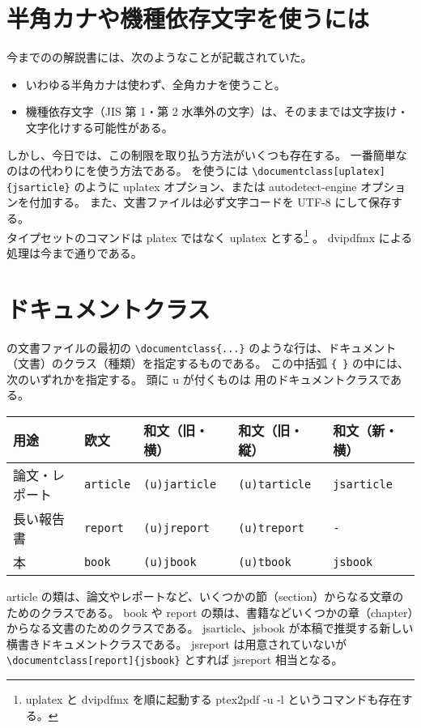 \section{半角カナや機種依存文字を使うには}
今までの\pLaTeX{}の解説書には、次のようなことが記載されていた。
\begin{itemize}\setlength{\leftskip}{-1.00zw}%
\item いわゆる半角カナは使わず、全角カナを使うこと。
\item 機種依存文字（JIS 第 1・第 2 水準外の文字）は、そのままでは文字抜け・文字化けする可能性がある。
\end{itemize}
しかし、今日では、この制限を取り払う方法がいくつも存在する。
一番簡単なのは\pLaTeX{}の代わりに\upLaTeX{}を使う方法である。
\upLaTeX{}を使うには \verb'\documentclass[uplatex]{jsarticle}' のように uplatex オプション、または autodetect-engine オプションを付加する。
また、文書ファイルは必ず文字コードを UTF-8 にして保存する。\\

タイプセットのコマンドは platex ではなく uplatex とする\footnote{uplatex と dvipdfmx を順に起動する ptex2pdf -u -l というコマンドも存在する。} 。
dvipdfmx による処理は今まで通りである。
\section{ドキュメントクラス}
\LaTeXe{}の文書ファイルの最初の \verb'\documentclass{...}' のような行は、ドキュメント（文書）のクラス（種類）を指定するものである。
この中括弧 \verb'{ }' の中には、次のいずれかを指定する。
頭に u が付くものは \upLaTeX{}用のドキュメントクラスである。
\begin{longtable}{l|llll}
  用途           & 欧文             & 和文（旧・横）       & 和文（旧・縦）       & 和文（新・横）     \\ \hline
  論文・レポート & \texttt{article} & \texttt{(u)jarticle} & \texttt{(u)tarticle} & \texttt{jsarticle} \\
  長い報告書     & \texttt{report}  & \texttt{(u)jreport}  & \texttt{(u)treport}  & \texttt{-}         \\
  本             & \texttt{book}    & \texttt{(u)jbook}    & \texttt{(u)tbook}    & \texttt{jsbook}    \\
\end{longtable}
article の類は、論文やレポートなど、いくつかの節（section）からなる文章のためのクラスである。
book や report の類は、書籍などいくつかの章（chapter）からなる文書のためのクラスである。
jsarticle、jsbook が本稿で推奨する新しい横書きドキュメントクラスである。
jsreport は用意されていないが \verb'\documentclass[report]{jsbook}' とすれば jsreport 相当となる。\\

